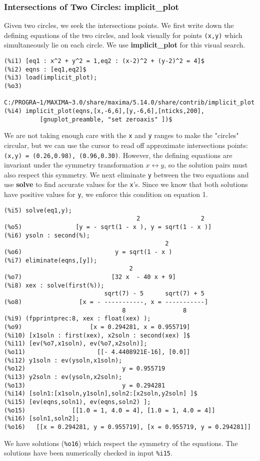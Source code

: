 \documentclass[12pt]{article}
\begin{document}
\subsubsection{Intersections of Two Circles:  implicit\_plot}
Given two circles, we seek the intersections points.
We first write down the defining equations of the two circles, and
  look visually for points \verb|(x,y)| which simultaneously lie on each circle.
We use \textbf{implicit\_plot} for this visual search.
\small
\begin{verbatim}
(%i1) [eq1 : x^2 + y^2 = 1,eq2 : (x-2)^2 + (y-2)^2 = 4]$
(%i2) eqns : [eq1,eq2]$
(%i3) load(implicit_plot);
(%o3) 
    C:/PROGRA~1/MAXIMA~3.0/share/maxima/5.14.0/share/contrib/implicit_plot.lisp
(%i4) implicit_plot(eqns,[x,-6,6],[y,-6,6],[nticks,200],
          [gnuplot_preamble, "set zeroaxis" ])$
\end{verbatim}
\normalsize
We are not taking enough care with the \verb|x| and \verb|y| ranges to make
  the "circles" circular, but we can use the cursor to read off approximate
  intersections points: \verb|(x,y) = (0.26,0.98), (0.96,0.30)|.
However, the defining equations are invariant under the symmetry
  transformation $x \leftrightarrow y$, so the solution pairs must
  also respect this symmetry.
We next eliminate \verb|y| between the two equations and use \textbf{solve}
  to find accurate values for the \verb|x|'s.
Since we know that both solutions have positive values for \verb|y|, we
  enforce this condition on equation 1.  
\small
\begin{verbatim}
(%i5) solve(eq1,y);
                                     2                 2
(%o5)               [y = - sqrt(1 - x ), y = sqrt(1 - x )]
(%i6) ysoln : second(%);
                                             2
(%o6)                          y = sqrt(1 - x )
(%i7) eliminate(eqns,[y]);
                                   2
(%o7)                         [32 x  - 40 x + 9]
(%i8) xex : solve(first(%));
                            sqrt(7) - 5      sqrt(7) + 5
(%o8)                [x = - -----------, x = -----------]
                                 8                8
(%i9) (fpprintprec:8, xex : float(xex) );
(%o9)                   [x = 0.294281, x = 0.955719]
(%i10) [x1soln : first(xex), x2soln : second(xex) ]$
(%i11) [ev(%o7,x1soln), ev(%o7,x2soln)];
(%o11)                    [[- 4.4408921E-16], [0.0]]
(%i12) y1soln : ev(ysoln,x1soln);
(%o12)                           y = 0.955719
(%i13) y2soln : ev(ysoln,x2soln);
(%o13)                           y = 0.294281
(%i14) [soln1:[x1soln,y1soln],soln2:[x2soln,y2soln] ]$
(%i15) [ev(eqns,soln1), ev(eqns,soln2) ];
(%o15)             [[1.0 = 1, 4.0 = 4], [1.0 = 1, 4.0 = 4]]
(%i16) [soln1,soln2];
(%o16)   [[x = 0.294281, y = 0.955719], [x = 0.955719, y = 0.294281]]
\end{verbatim}
\normalsize
We have solutions (\verb|%o16|) which respect the symmetry of the equations.
The solutions have been numerically checked in input \verb|%i15|.  \\
  
\end{document}
